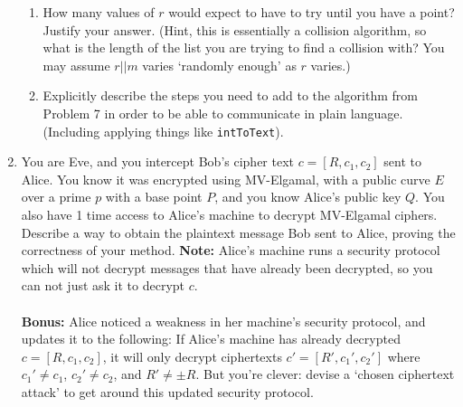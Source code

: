 \documentclass[11pt]{article}
\newcommand{\bF}{\mathbb{F}}
\begin{document}
\begin{enumerate}
{\begin{enumerate}
{    \begin{enumerate}[(1)]
      \item{
      Start with a plaintext message $m$, stored as an integer $k$-bits in length.
      }
      \item{
      Choose a random integer $r$, also $k$-bits in length.
      }
      \item{
      Compute $r||m\in\bF_p$.
      }
      \item{
      Detect if $r||m$ is the $x$ coordinate of a point in $E(\bF_p)$.  If so, compute the $y$ coordinate, and return $P = (r||m,y)$ as your plaintext for the elliptic curve encryption.  Otherwise return to step 2.
      }
    \end{enumerate}
    Describe exactly how Step 4 would be carried out.  (You may assume that you have a fast algorithm to compute square roots modulo $p$ if they exist).  Conversely explain how to reverse the algorithm to recover the plaintext from a point.
    }
    \item{
    How many values of $r$ would expect to have to try until you have a point?  Justify your answer.  (Hint, this is essentially a collision algorithm, so what is the length of the list you are trying to find a collision with?  You may assume $r||m$ varies `randomly enough' as $r$ varies.)
    }
    \item{
    Explicitly describe the steps you need to add to the algorithm from Problem 7 in order to be able to communicate in plain language.  (Including applying things like \verb|intToText|).
    }
  \end{enumerate}
  }
  \item{
  You are Eve, and you intercept Bob's cipher text $c = [R,c_1,c_2]$ sent to Alice.  You know it was encrypted using MV-Elgamal, with a public curve $E$ over a prime $p$ with a base point $P$, and you know Alice's public key $Q$.  You also have 1 time access to Alice's machine to decrypt MV-Elgamal ciphers.  Describe a way to obtain the plaintext message Bob sent to Alice, proving the correctness of your method.  \textbf{Note:} Alice's machine runs a security protocol which will not decrypt messages that have already been decrypted, so you can not just ask it to decrypt $c$.\\
  \\
  \textbf{Bonus: }Alice noticed a weakness in her machine's security protocol, and updates it to the following: If Alice's machine has already decrypted $c = [R,c_1,c_2]$, it will only decrypt ciphertexts $c' = [R',c_1',c_2']$ where $c_1'\not=c_1$, $c_2'\not=c_2$, and $R'\not=\pm R$.  But you're clever: devise a `chosen ciphertext attack' to get around this updated security protocol.
  }
\end{enumerate}
\end{document}

